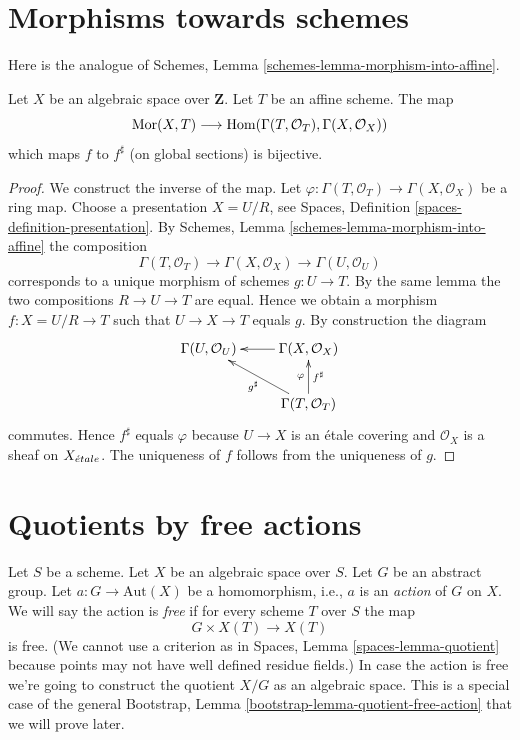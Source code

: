 \section{Morphisms towards schemes}
\label{section-morphisms-to-schemes}

\noindent
Here is the analogue of
Schemes, Lemma \ref{schemes-lemma-morphism-into-affine}.

\begin{lemma}
\label{lemma-morphism-to-affine-scheme}
Let $X$ be an algebraic space over $\mathbf{Z}$.
Let $T$ be an affine scheme.
The map
$$
\mathop{\mathrm{Mor}}\nolimits(X, T)
\longrightarrow
\mathop{\mathrm{Hom}}\nolimits(\Gamma(T, \mathcal{O}_T), \Gamma(X, \mathcal{O}_X))
$$
which maps $f$ to $f^\sharp$ (on global sections) is bijective.
\end{lemma}

\begin{proof}
We construct the inverse of the map.
Let $\varphi : \Gamma(T, \mathcal{O}_T) \to \Gamma(X, \mathcal{O}_X)$
be a ring map. Choose a presentation $X = U/R$, see
Spaces, Definition \ref{spaces-definition-presentation}.
By
Schemes, Lemma \ref{schemes-lemma-morphism-into-affine}
the composition
$$
\Gamma(T, \mathcal{O}_T) \to \Gamma(X, \mathcal{O}_X) \to
\Gamma(U, \mathcal{O}_U)
$$
corresponds to a unique morphism of schemes $g : U \to T$. By the same lemma
the two compositions $R \to U \to T$ are equal. Hence we obtain a morphism
$f : X = U/R \to T$ such that $U \to X \to T$ equals $g$. By construction
the diagram
$$
\xymatrix{
\Gamma(U, \mathcal{O}_U) & \Gamma(X, \mathcal{O}_X) \ar[l] \\
& \Gamma(T, \mathcal{O}_T) \ar[lu]^{g^\sharp} \ar[u]^{\varphi}_{f^\sharp}
}
$$
commutes. Hence $f^\sharp$ equals $\varphi$ because $U \to X$ is an
\'etale covering and $\mathcal{O}_X$ is a sheaf on $X_{\acute{e}tale}$.
The uniqueness of $f$ follows from the uniqueness of $g$.
\end{proof}





\section{Quotients by free actions}
\label{section-quotient-by-free}

\noindent
Let $S$ be a scheme.
Let $X$ be an algebraic space over $S$.
Let $G$ be an abstract group.
Let $a : G \to \text{Aut}(X)$ be a homomorphism, i.e., $a$ is an
{\it action} of $G$ on $X$. We will say the action is {\it free}
if for every scheme $T$ over $S$ the map
$$
G \times X(T) \longrightarrow X(T)
$$
is free. (We cannot use a criterion as in
Spaces, Lemma \ref{spaces-lemma-quotient}
because points may not have well defined residue fields.)
In case the action is free we're going to construct the quotient $X/G$
as an algebraic space. This is a special case of the general
Bootstrap, Lemma \ref{bootstrap-lemma-quotient-free-action}
that we will prove later.

